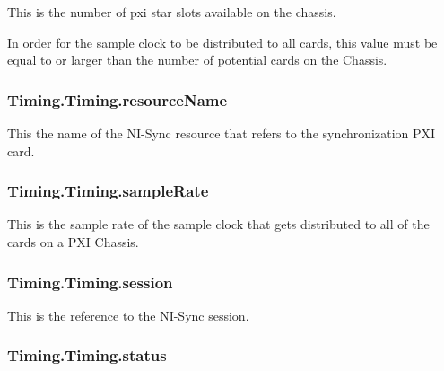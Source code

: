 This is the number of pxi star slots available on the chassis. 

In order for the sample clock to be distributed to all cards, this value must be equal to or larger than the number of potential cards on the Chassis. \hypertarget{class_timing_1_1_timing_a8ce8605fb1b55c4a7a0db05c6b1a551c}{
\subsubsection[{resource\-Name}]{\setlength{\rightskip}{0pt plus 5cm}Timing.\-Timing.\-resource\-Name}}\label{class_timing_1_1_timing_a8ce8605fb1b55c4a7a0db05c6b1a551c}


This the name of the N\-I-\/\-Sync resource that refers to the synchronization P\-X\-I card. 

\hypertarget{class_timing_1_1_timing_a645c0a6e372274c15036da2cdd81ce51}{
\subsubsection[{sample\-Rate}]{\setlength{\rightskip}{0pt plus 5cm}Timing.\-Timing.\-sample\-Rate}}\label{class_timing_1_1_timing_a645c0a6e372274c15036da2cdd81ce51}


This is the sample rate of the sample clock that gets distributed to all of the cards on a P\-X\-I Chassis. 

\hypertarget{class_timing_1_1_timing_ac6ffaf6ca94b488dba1c56a780b01cfb}{
\subsubsection[{session}]{\setlength{\rightskip}{0pt plus 5cm}Timing.\-Timing.\-session}}\label{class_timing_1_1_timing_ac6ffaf6ca94b488dba1c56a780b01cfb}


This is the reference to the N\-I-\/\-Sync session. 

\hypertarget{class_timing_1_1_timing_aa54e754e141f10df585dbe3bf86729ef}{
\subsubsection[{status}]{\setlength{\rightskip}{0pt plus 5cm}Timing.\-Timing.\-status}}\label{class_timing_1_1_timing_aa54e754e141f10df585dbe3bf86729ef}


